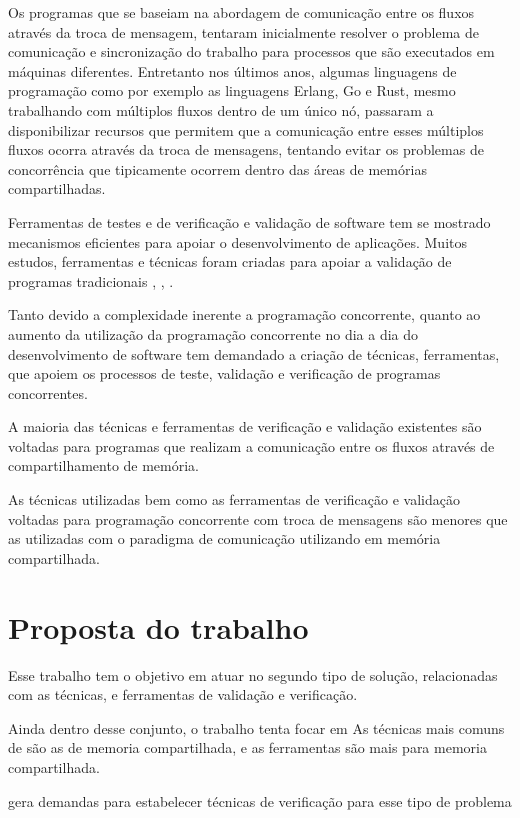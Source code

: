  Os programas que se baseiam na abordagem de comunicação entre os fluxos através da troca de mensagem, tentaram inicialmente resolver o problema de comunicação e sincronização do trabalho para processos que são executados em máquinas diferentes. Entretanto nos últimos anos, algumas linguagens de programação como por exemplo as linguagens Erlang, Go e Rust, mesmo trabalhando com múltiplos fluxos dentro de um único nó, passaram a disponibilizar recursos que permitem que a comunicação entre esses múltiplos fluxos ocorra através da troca de mensagens, tentando evitar os problemas de concorrência que tipicamente ocorrem dentro das áreas de memórias compartilhadas.

 Ferramentas de testes e de verificação e validação de software tem se mostrado mecanismos eficientes para apoiar o desenvolvimento de aplicações. Muitos estudos, ferramentas e técnicas foram criadas para apoiar a validação de programas tradicionais \cite{myers_art_2012}, \cite{DAVIDCOWARD1988189}, \cite{umar2019study}.

 Tanto devido a complexidade inerente a programação concorrente, quanto ao aumento da utilização da programação concorrente no dia a dia do desenvolvimento de software tem demandado a criação de técnicas, ferramentas, que apoiem os processos de teste, validação e verificação de programas concorrentes. 
 
 A maioria das técnicas e ferramentas de verificação e validação existentes são voltadas para programas que realizam a comunicação entre os fluxos através de compartilhamento de memória.

 As técnicas utilizadas bem como as ferramentas de verificação e validação voltadas para programação concorrente com troca de mensagens são menores que as utilizadas com o paradigma de comunicação utilizando em memória compartilhada.

 \section{Proposta do trabalho}

Esse trabalho tem o objetivo em atuar no segundo tipo de solução, relacionadas com as técnicas, e ferramentas de validação e verificação.  

Ainda dentro desse conjunto, o trabalho tenta focar em As técnicas mais comuns de são as de memoria compartilhada, e as ferramentas são mais para memoria compartilhada.

gera demandas para estabelecer técnicas de verificação para esse tipo de problema


